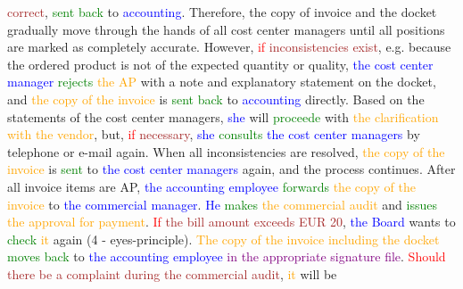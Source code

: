 \textcolor{brown}{correct}, \textcolor{green}{sent} \textcolor{green}{back} to \textcolor{blue}{accounting}. Therefore, the copy of invoice and the docket gradually move through the hands of all cost center managers until all positions are marked as completely accurate. However, \textcolor{red}{if} \textcolor{brown}{inconsistencies} \textcolor{brown}{exist}, e.g. because the ordered product is not of the expected quantity or quality, \textcolor{blue}{the} \textcolor{blue}{cost} \textcolor{blue}{center} \textcolor{blue}{manager} \textcolor{green}{rejects} \textcolor{orange}{the} \textcolor{orange}{AP} with a note and explanatory statement on the docket, and \textcolor{orange}{the} \textcolor{orange}{copy} \textcolor{orange}{of} \textcolor{orange}{the} \textcolor{orange}{invoice} is \textcolor{green}{sent} \textcolor{green}{back} to \textcolor{blue}{accounting} directly. Based on the statements of the cost center managers, \textcolor{blue}{she} will \textcolor{green}{proceede} with \textcolor{orange}{the} \textcolor{orange}{clarification} \textcolor{orange}{with} \textcolor{orange}{the} \textcolor{orange}{vendor}, but, \textcolor{red}{if} \textcolor{brown}{necessary}, \textcolor{blue}{she} \textcolor{green}{consults} \textcolor{blue}{the} \textcolor{blue}{cost} \textcolor{blue}{center} \textcolor{blue}{managers} by telephone or e-mail again. When all inconsistencies are resolved, \textcolor{orange}{the} \textcolor{orange}{copy} \textcolor{orange}{of} \textcolor{orange}{the} \textcolor{orange}{invoice} is \textcolor{green}{sent} to \textcolor{blue}{the} \textcolor{blue}{cost} \textcolor{blue}{center} \textcolor{blue}{managers} again, and the process continues. After all invoice items are AP, \textcolor{blue}{the} \textcolor{blue}{accounting} \textcolor{blue}{employee} \textcolor{green}{forwards} \textcolor{orange}{the} \textcolor{orange}{copy} \textcolor{orange}{of} \textcolor{orange}{the} \textcolor{orange}{invoice} to \textcolor{blue}{the} \textcolor{blue}{commercial} \textcolor{blue}{manager}. \textcolor{blue}{He} \textcolor{green}{makes} \textcolor{orange}{the} \textcolor{orange}{commercial} \textcolor{orange}{audit} and \textcolor{green}{issues} \textcolor{orange}{the} \textcolor{orange}{approval} \textcolor{orange}{for} \textcolor{orange}{payment}. \textcolor{red}{If} \textcolor{brown}{the} \textcolor{brown}{bill} \textcolor{brown}{amount} \textcolor{brown}{exceeds} \textcolor{brown}{EUR} \textcolor{brown}{20}, \textcolor{blue}{the} \textcolor{blue}{Board} wants to \textcolor{green}{check} \textcolor{orange}{it} again (4 - eyes-principle). \textcolor{orange}{The} \textcolor{orange}{copy} \textcolor{orange}{of} \textcolor{orange}{the} \textcolor{orange}{invoice} \textcolor{orange}{including} \textcolor{orange}{the} \textcolor{orange}{docket} \textcolor{green}{moves} \textcolor{green}{back} to \textcolor{blue}{the} \textcolor{blue}{accounting} \textcolor{blue}{employee} \textcolor{purple}{in} \textcolor{purple}{the} \textcolor{purple}{appropriate} \textcolor{purple}{signature} \textcolor{purple}{file}. \textcolor{red}{Should} \textcolor{brown}{there} \textcolor{brown}{be} \textcolor{brown}{a} \textcolor{brown}{complaint} \textcolor{brown}{during} \textcolor{brown}{the} \textcolor{brown}{commercial} \textcolor{brown}{audit}, \textcolor{orange}{it} will be 